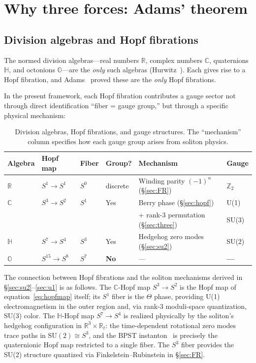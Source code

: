 \documentclass[a4paper,12pt]{article}
\begin{document}
\section{Why three forces: Adams' theorem}
\label{sec:adams}

\subsection{Division algebras and Hopf fibrations}

The normed division algebras---real numbers $\mathbb{R}$, complex
numbers $\mathbb{C}$, quaternions $\mathbb{H}$, and octonions
$\mathbb{O}$---are the \emph{only} such algebras
(Hurwitz~\cite{Hurwitz1898}). Each gives rise to a Hopf fibration,
and Adams~\cite{Adams1960} proved these are the \emph{only} Hopf
fibrations.

In the present framework, each Hopf fibration contributes a gauge
sector not through direct identification ``fiber = gauge group,''
but through a specific physical mechanism:

\begin{table}[t]
\centering
\caption{Division algebras, Hopf fibrations, and gauge structures.
The ``mechanism'' column specifies how each gauge group arises from
soliton physics.}
\label{tab:adams}
\begin{tabular}{@{}llllll@{}}
\toprule
Algebra & Hopf map & Fiber & Group? & Mechanism & Gauge \\
\midrule
$\mathbb{R}$ & $S^1 \to S^1$ & $S^0$ & discrete
 & Winding parity $(-1)^n$ (§\ref{sec:FR}) & $\mathbb{Z}_2$ \\
$\mathbb{C}$ & $S^3 \to S^2$ & $S^1$ & Yes
 & Berry phase (§\ref{sec:hopf}) & U(1) \\
 & & & & + rank-3 permutation (§\ref{sec:three}) & SU(3) \\
$\mathbb{H}$ & $S^7 \to S^4$ & $S^3$ & Yes
 & Hedgehog zero modes (§\ref{sec:su2}) & SU(2) \\
$\mathbb{O}$ & $S^{15} \to S^8$ & $S^7$ & \textbf{No}
 & --- & \textbf{---} \\
\bottomrule
\end{tabular}
\end{table}

The connection between Hopf fibrations and the soliton mechanisms
derived in §\ref{sec:su2}--\ref{sec:u1} is as follows. The
$\mathbb{C}$-Hopf map $S^3 \to S^2$ is the Hopf map of
equation~\eqref{eq:hopfmap} itself; its $S^1$ fiber is the $\Theta$
phase, providing U(1) electromagnetism in the outer region and, via
rank-3 moduli-space quantization, SU(3) color. The
$\mathbb{H}$-Hopf map $S^7 \to S^4$ is realized physically by the
soliton's hedgehog configuration in $\mathbb{R}^3 \times
\mathbb{R}_t$: the time-dependent rotational zero modes trace paths
in $\mathrm{SU}(2) \cong S^3$, and the BPST instanton~\cite{BPST1975}
is precisely the quaternionic Hopf map restricted to a single fiber.
The $S^3$ fiber provides the SU(2) structure quantized via
Finkelstein--Rubinstein in §\ref{sec:FR}.
\end{document}
